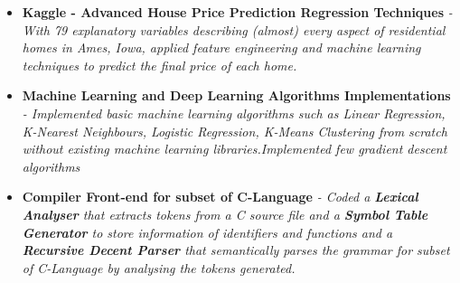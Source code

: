 \documentclass{article}
\begin{document}
\begin{itemize}
    \item{\textbf{\large{Kaggle - Advanced House Price Prediction Regression Techniques}}}
          \newline
          \textit{-With 79 explanatory variables describing (almost) every aspect of residential homes in Ames, Iowa, applied feature engineering and machine learning techniques to predict the final price of each home.}
    \item{\textbf{\large{Machine Learning and Deep Learning Algorithms Implementations}}}
          \newline
          \textit{- Implemented basic machine learning algorithms such as Linear Regression, K-Nearest Neighbours, Logistic Regression, K-Means Clustering from scratch without existing machine learning libraries.Implemented few gradient descent algorithms
          }
          \newline
    \item{\textbf{\large{Compiler Front-end for subset of C-Language}}}
          \newline
          \textit{- Coded a \textbf{Lexical Analyser} that extracts tokens from a C source file and a \textbf{Symbol Table Generator} to store information of identifiers and functions and a \textbf{Recursive Decent Parser} that semantically parses the grammar for subset of C-Language by analysing the tokens generated.}
\end{itemize}
\end{document}

